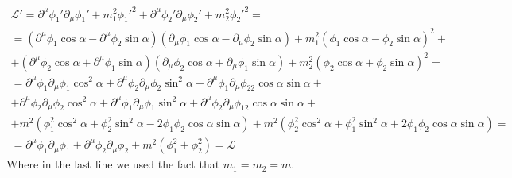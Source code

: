 \documentclass{article}
\begin{document}
\begin{equation}
\begin{gathered}
    \mathcal{L}' =
    \partial^\mu\phi_1'\partial_\mu\phi_1' + m_1^2\phi_1'^2 +
    \partial^\mu\phi_2'\partial_\mu\phi_2' + m_2^2\phi_2'^2 = \\ =
    (\partial^\mu\phi_1\cos\alpha - \partial^\mu\phi_2\sin\alpha)(\partial_\mu\phi_1\cos\alpha - \partial_\mu\phi_2\sin\alpha) + m_1^2(\phi_1\cos\alpha - \phi_2\sin\alpha)^2 + \\ + (\partial^\mu\phi_2\cos\alpha + \partial^\mu\phi_1\sin\alpha)(\partial_\mu\phi_2\cos\alpha + \partial_\mu\phi_1\sin\alpha) + m_2^2(\phi_2\cos\alpha + \phi_2\sin\alpha)^2 = \\ =
    \partial^\mu\phi_1\partial_\mu\phi_1\cos^2\alpha + 
    \partial^\mu\phi_2\partial_\mu\phi_2\sin^2\alpha -
    \partial^\mu\phi_1\partial_\mu\phi_22\cos\alpha\sin\alpha + \\ +
    \partial^\mu\phi_2\partial_\mu\phi_2\cos^2\alpha +
    \partial^\mu\phi_1\partial_\mu\phi_1\sin^2\alpha +
    \partial^\mu\phi_2\partial_\mu\phi_12\cos\alpha\sin\alpha +  \\ +
    m^2 \left(\phi_1^2\cos^2\alpha + \phi_2^2\sin^2\alpha - 2\phi_1\phi_2\cos\alpha\sin\alpha\right) +
    m^2 \left(\phi_2^2\cos^2\alpha + \phi_1^2\sin^2\alpha + 2\phi_1\phi_2\cos\alpha\sin\alpha\right) = \\ =
    \partial^\mu\phi_1\partial_\mu\phi_1 + \partial^\mu\phi_2\partial_\mu\phi_2 + m^2\left(\phi_1^2 + \phi_2^2\right) = \mathcal{L}
\end{gathered}
\end{equation}
Where in the last line we used the fact that $m_1 = m_2 = m$.
\end{document}
